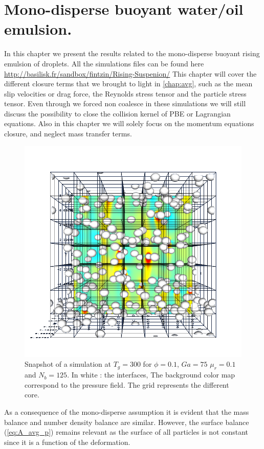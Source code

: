 \chapter{Mono-disperse buoyant water/oil emulsion.}
\label{chap:mono-disperse}

In this chapter we present the results related to the mono-disperse buoyant rising  emulsion of droplets.
All the simulations files can be found here \url{http://basilisk.fr/sandbox/fintzin/Rising-Suspenion/}
This chapter will cover the different closure terms that we brought to light in \ref{chap:avg}, such as the mean slip velocities or drag force, the Reynolds stress tensor and the particle stress tensor.
Even through we forced non coalesce in these simulations we will still discuss the possibility to close the collision kernel of PBE or Lagrangian equations. 
Also in this chapter we will solely focus on the momentum equations closure, and neglect mass transfer terms. 
\begin{figure}
    \centering
    \includegraphics[width = 0.8 \textwidth]{image/PHI_01_Ga_75.png}
    \caption{Snapshot of a simulation at $T_g = 300$ for $\phi = 0.1$, $Ga = 75$ $\mu_r = 0.1$ and $N_b = 125$. In white : the interfaces, The background color map correspond to the pressure field. The grid represents the different core.}
    \label{fig:pic_sim}
\end{figure}
As a consequence of the mono-disperse assumption it is evident that the mass balance and number density balance are similar. 
However, the surface balance (\ref{eq:A_avg_p}) remains relevant as the surface of all particles is not constant since it is a function of the deformation. 
